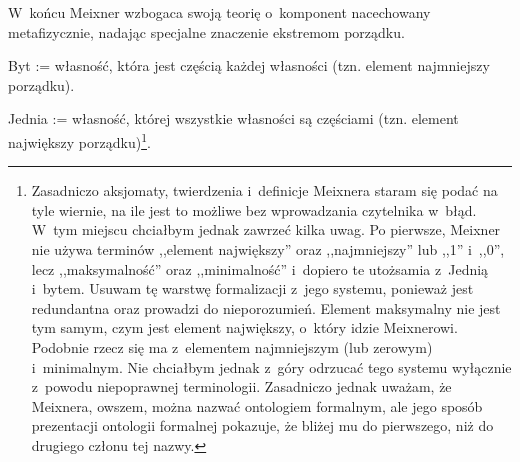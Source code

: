 
%
W~końcu Meixner wzbogaca swoją teorię o~komponent nacechowany metafizycznie, nadając specjalne znaczenie ekstremom porządku.
\begin{defin}\label{mei-def1}
Byt := własność, która jest częścią każdej własności (tzn. element najmniejszy porządku).
\end{defin}
\begin{defin}\label{mei-def2}
Jednia := własność, której wszystkie własności są częściami (tzn. element największy porządku)\footnote{\label{przyp-mei-niesc}Zasadniczo aksjomaty, twierdzenia i~definicje Meixnera staram się podać na tyle wiernie, na ile jest to możliwe bez wprowadzania czytelnika w~błąd. W~tym miejscu chciałbym jednak zawrzeć kilka uwag. Po pierwsze, Meixner nie używa terminów ,,element największy'' oraz ,,najmniejszy'' lub ,,1'' i~,,0'', lecz ,,maksymalność'' oraz ,,minimalność'' i~dopiero te utożsamia z~Jednią i~bytem. Usuwam tę warstwę formalizacji z~jego systemu, ponieważ jest redundantna oraz prowadzi do nieporozumień. Element maksymalny nie jest tym samym, czym jest element największy, o~który idzie Meixnerowi. Podobnie rzecz się ma z~elementem najmniejszym (lub zerowym) i~minimalnym. Nie chciałbym jednak z~góry odrzucać tego systemu wyłącznie z~powodu niepoprawnej terminologii. Zasadniczo jednak uważam, że Meixnera, owszem, można nazwać ontologiem formalnym, ale jego sposób prezentacji ontologii formalnej pokazuje, że bliżej mu do pierwszego, niż do drugiego członu tej nazwy.}.
\end{defin}
